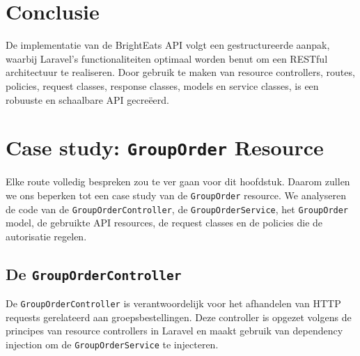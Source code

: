 \section{Conclusie}

De implementatie van de Bright\-Eats API volgt een gestructureerde aanpak, waarbij Laravel's functionaliteiten optimaal worden benut om een RESTful architectuur te realiseren. Door gebruik te maken van resource controllers, routes, policies, request classes, response classes, models en service classes, is een robuuste en schaalbare API gecreëerd.

\section{Case study: \texttt{GroupOrder} Resource}

Elke route volledig bespreken zou te ver gaan voor dit hoofdstuk. Daarom zullen we ons beperken tot een case study van de \texttt{GroupOrder} resource. We analyseren de code van de \texttt{GroupOrderController}, de \texttt{GroupOrderService}, het \texttt{GroupOrder} model, de gebruikte API resources, de request classes en de policies die de autorisatie regelen.

\subsection{De \texttt{GroupOrderController}}

De \texttt{GroupOrderController} is verantwoordelijk voor het afhandelen van HTTP requests gerelateerd aan groepsbestellingen. Deze controller is opgezet volgens de principes van resource controllers in Laravel en maakt gebruik van dependency injection om de \texttt{GroupOrderService} te injecteren.

